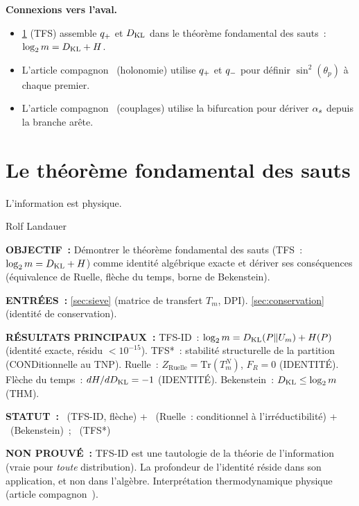 \documentclass[12pt,a4paper]{article}
\begin{document}
\medskip\noindent\textbf{Connexions vers l'aval.}
\begin{itemize}
\item \cref{sec:gft} (TFS) assemble $q_{+}$ et $D_{\mathrm{KL}}$ dans le
  théorème fondamental des sauts~: $\log_2 m = D_{\mathrm{KL}} + H$.
\item L'article compagnon~\cite{companion_M2} (holonomie) utilise
  $q_{+}$ et $q_{-}$ pour définir $\sin^2(\theta_p)$ à chaque
  premier.
\item L'article compagnon~\cite{companion_M5} (couplages) utilise la
  bifurcation pour dériver $\alpha_{s}$ depuis la branche arête.
\end{itemize}


\section{Le théorème fondamental des sauts}
\label{sec:gft}

\epigraph{L'information est physique.}{Rolf Landauer}

\begin{statusbox}
\textbf{OBJECTIF~:}
  Démontrer le théorème fondamental des sauts (TFS~:
  $\log_2 m = D_{\mathrm{KL}} + H$) comme identité algébrique exacte et dériver
  ses conséquences (équivalence de Ruelle, flèche du temps, borne de
  Bekenstein).

\textbf{ENTRÉES~:}
  \cref{sec:sieve} (matrice de transfert $T_m$, DPI).
  \cref{sec:conservation} (identité de conservation).

\textbf{RÉSULTATS PRINCIPAUX~:}
  TFS-ID~: $\log_2 m = D_{\mathrm{KL}}(P\|U_m) + H(P)$ (identité exacte, résidu
  $<10^{-15}$).
  TFS*~: stabilité structurelle de la partition (CONDitionnelle au TNP).
  Ruelle~: $Z_{\mathrm{Ruelle}} = \mathrm{Tr}(T_m^N)$, $F_R = 0$
  (IDENTITÉ).
  Flèche du temps~: $dH/dD_{\mathrm{KL}} = -1$ (IDENTITÉ).
  Bekenstein~: $D_{\mathrm{KL}} \leq \log_2 m$ (THM).

\textbf{STATUT~:}
  \IDTAG~(TFS-ID, flèche) + \CONDTAG~(Ruelle~: conditionnel à
  l'irréductibilité) + \THMTAG~(Bekenstein)~; \CONDTAG~(TFS*)

\textbf{NON PROUVÉ~:}
  TFS-ID est une tautologie de la théorie de l'information (vraie
  pour \emph{toute} distribution).
  La profondeur de l'identité réside dans son application, et non
  dans l'algèbre.
  Interprétation thermodynamique physique (article
  compagnon~\cite{companion_M5}).
\end{statusbox}
\end{document}
